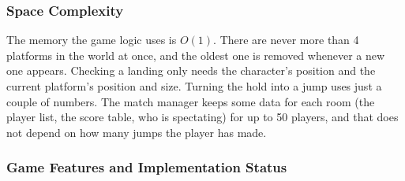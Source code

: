 \documentclass[12pt,letterpaper]{article}
\begin{document}
\subsubsection{Space Complexity}

The memory the game logic uses is $O(1)$. There are never more than 4 platforms in the world at once, and the oldest one is removed whenever a new one appears. Checking a landing only needs the character's position and the current platform's position and size. Turning the hold into a jump uses just a couple of numbers. The match manager keeps some data for each room (the player list, the score table, who is spectating) for up to 50 players, and that does not depend on how many jumps the player has made.

\subsubsection{Game Features and Implementation Status}
\end{document}
